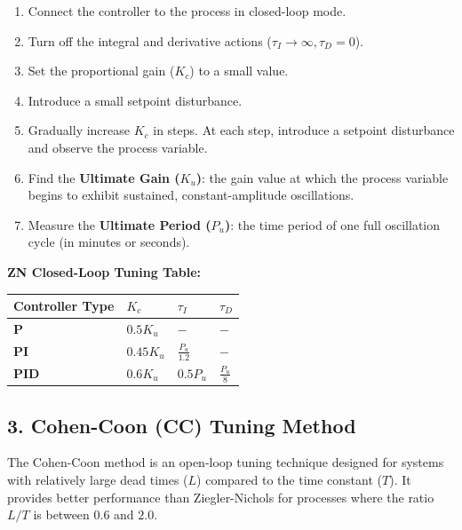 \begin{enumerate}
  \item Connect the controller to the process in closed-loop mode.
  \item Turn off the integral and derivative actions ($\tau_I \to \infty, \tau_D = 0$).
  \item Set the proportional gain ($K_c$) to a small value.
  \item Introduce a small setpoint disturbance.
  \item Gradually increase $K_c$ in steps. At each step, introduce a setpoint disturbance and observe the process variable.
  \item Find the \textbf{Ultimate Gain ($K_u$)}: the gain value at which the process variable begins to exhibit sustained, constant-amplitude oscillations.
  \item Measure the \textbf{Ultimate Period ($P_u$)}: the time period of one full oscillation cycle (in minutes or seconds).
\end{enumerate}

\textbf{ZN Closed-Loop Tuning Table:}
\begin{table}[H]
\centering
\begin{tabular}{|p{}|p{}|p{}|p{}|}
\hline
Controller Type & $K_c$ & $\tau_I$ & $\tau_D$ \\
\hline
\textbf{P} & $0.5 K_u$ & $-$ & $-$ \\
\hline
\textbf{PI} & $0.45 K_u$ & $\frac{P_u}{1.2}$ & $-$ \\
\hline
\textbf{PID} & $0.6 K_u$ & $0.5 P_u$ & $\frac{P_u}{8}$ \\
\hline
\end{tabular}
\end{table}


\subsection{3. Cohen-Coon (CC) Tuning Method}
The Cohen-Coon method is an open-loop tuning technique designed for systems with relatively large dead times ($L$) compared to the time constant ($T$). It provides better performance than Ziegler-Nichols for processes where the ratio $L/T$ is between $0.6$ and $2.0$.

